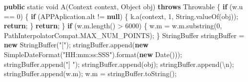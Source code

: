 \documentclass[
]{article}
\newenvironment{Shaded}{}{}
\newcommand{\BuiltInTok}[1]{\textcolor[rgb]{0.00,0.50,0.00}{#1}}
\newcommand{\CharTok}[1]{\textcolor[rgb]{0.25,0.44,0.63}{#1}}
\newcommand{\ControlFlowTok}[1]{\textcolor[rgb]{0.00,0.44,0.13}{\textbf{#1}}}
\newcommand{\DataTypeTok}[1]{\textcolor[rgb]{0.56,0.13,0.00}{#1}}
\newcommand{\DecValTok}[1]{\textcolor[rgb]{0.25,0.63,0.44}{#1}}
\newcommand{\FunctionTok}[1]{\textcolor[rgb]{0.02,0.16,0.49}{#1}}
\newcommand{\KeywordTok}[1]{\textcolor[rgb]{0.00,0.44,0.13}{\textbf{#1}}}
\newcommand{\NormalTok}[1]{#1}
\newcommand{\OperatorTok}[1]{\textcolor[rgb]{0.40,0.40,0.40}{#1}}
\newcommand{\StringTok}[1]{\textcolor[rgb]{0.25,0.44,0.63}{#1}}
\begin{document}
\begin{Shaded}
\begin{Highlighting}[]
    \KeywordTok{public} \DataTypeTok{static} \DataTypeTok{void} \FunctionTok{A}\OperatorTok{(}\BuiltInTok{Context}\NormalTok{ context}\OperatorTok{,} \BuiltInTok{Object}\NormalTok{ obj}\OperatorTok{)} \KeywordTok{throws} \BuiltInTok{Throwable} \OperatorTok{\{}
        \ControlFlowTok{if} \OperatorTok{(}\NormalTok{w}\OperatorTok{.}\FunctionTok{u} \OperatorTok{==} \DecValTok{0}\OperatorTok{)} \OperatorTok{\{}
            \ControlFlowTok{if} \OperatorTok{(}\NormalTok{APPAplication}\OperatorTok{.}\FunctionTok{alt} \OperatorTok{!=} \KeywordTok{null}\OperatorTok{)} \OperatorTok{\{}
\NormalTok{                k}\OperatorTok{.}\FunctionTok{a}\OperatorTok{(}\NormalTok{context}\OperatorTok{,} \DecValTok{1}\OperatorTok{,} \BuiltInTok{String}\OperatorTok{.}\FunctionTok{valueOf}\OperatorTok{(}\NormalTok{obj}\OperatorTok{));}
                \ControlFlowTok{return}\OperatorTok{;}
            \OperatorTok{\}}
            \ControlFlowTok{return}\OperatorTok{;}
        \OperatorTok{\}}
        \ControlFlowTok{if} \OperatorTok{(}\NormalTok{w}\OperatorTok{.}\FunctionTok{m}\OperatorTok{.}\FunctionTok{length}\OperatorTok{()} \OperatorTok{\textgreater{}} \DecValTok{6000}\OperatorTok{)} \OperatorTok{\{}
\NormalTok{            w}\OperatorTok{.}\FunctionTok{m} \OperatorTok{=}\NormalTok{ w}\OperatorTok{.}\FunctionTok{m}\OperatorTok{.}\FunctionTok{substring}\OperatorTok{(}\DecValTok{0}\OperatorTok{,}\NormalTok{ PathInterpolatorCompat}\OperatorTok{.}\FunctionTok{MAX\_NUM\_POINTS}\OperatorTok{);}
        \OperatorTok{\}}
        \BuiltInTok{StringBuffer}\NormalTok{ stringBuffer }\OperatorTok{=} \KeywordTok{new} \BuiltInTok{StringBuffer}\OperatorTok{(}\StringTok{"["}\OperatorTok{);}
\NormalTok{        stringBuffer}\OperatorTok{.}\FunctionTok{append}\OperatorTok{(}\KeywordTok{new} \BuiltInTok{SimpleDateFormat}\OperatorTok{(}\StringTok{"HH:mm:ss:SSS"}\OperatorTok{).}\FunctionTok{format}\OperatorTok{(}\KeywordTok{new} \BuiltInTok{Date}\OperatorTok{()));}
\NormalTok{        stringBuffer}\OperatorTok{.}\FunctionTok{append}\OperatorTok{(}\StringTok{"]  "}\OperatorTok{);}
\NormalTok{        stringBuffer}\OperatorTok{.}\FunctionTok{append}\OperatorTok{(}\NormalTok{obj}\OperatorTok{);}
\NormalTok{        stringBuffer}\OperatorTok{.}\FunctionTok{append}\OperatorTok{(}\CharTok{\textquotesingle{}\textbackslash{}n\textquotesingle{}}\OperatorTok{);}
\NormalTok{        stringBuffer}\OperatorTok{.}\FunctionTok{append}\OperatorTok{(}\NormalTok{w}\OperatorTok{.}\FunctionTok{m}\OperatorTok{);}
\NormalTok{        w}\OperatorTok{.}\FunctionTok{m} \OperatorTok{=}\NormalTok{ stringBuffer}\OperatorTok{.}\FunctionTok{toString}\OperatorTok{();}

\end{Highlighting}
\end{Shaded}
\end{document}
